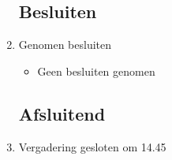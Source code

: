 \documentclass{article}
\begin{document}
\begin{enumerate}
	\subsection*{Besluiten}
	\item Genomen besluiten
	\begin{itemize}
		\item Geen besluiten genomen
	\end{itemize}

	\noindent 
	\subsection*{Afsluitend}
	\item Vergadering gesloten om 14.45%

\end{enumerate}
\end{document}
